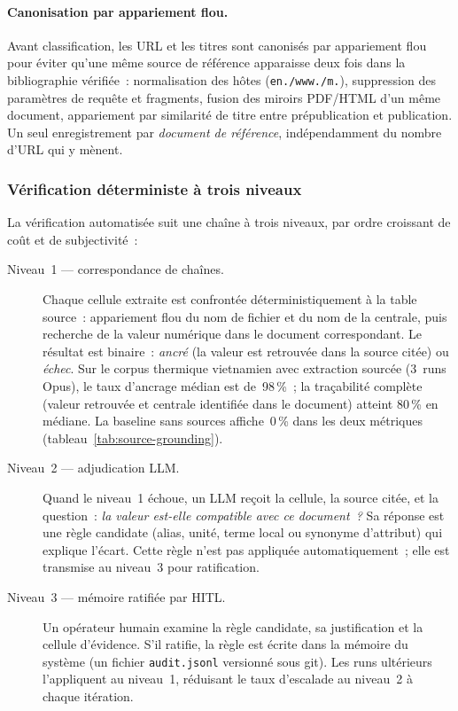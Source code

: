 \paragraph{Canonisation par appariement flou.}
Avant classification, les URL et les titres sont canonisés par
appariement flou pour éviter qu'une même source de référence apparaisse
deux fois dans la bibliographie vérifiée~: normalisation des hôtes
(\texttt{en./www./m.}), suppression des paramètres de requête et
fragments, fusion des miroirs PDF/HTML d'un même document, appariement
par similarité de titre entre prépublication et publication. Un seul
enregistrement par \emph{document de référence}, indépendamment du
nombre d'URL qui y mènent.

\subsubsection{Vérification déterministe à trois niveaux}\label{sec:verif-tiers}

La vérification automatisée suit une chaîne à trois niveaux, par ordre
croissant de coût et de subjectivité~:

\begin{description}
\item[Niveau~1 --- correspondance de chaînes.]
  Chaque cellule extraite est confrontée déterministiquement à la table
  source~: appariement flou du nom de fichier et du nom de la centrale, puis
  recherche de la valeur numérique dans le document correspondant. Le résultat
  est binaire~: \emph{ancré} (la valeur est retrouvée dans la source citée)
  ou \emph{échec}. Sur le corpus thermique vietnamien avec extraction sourcée
  (3~runs Opus), le taux d'ancrage médian est de~98\,\%~; la traçabilité
  complète (valeur retrouvée et centrale identifiée dans le document) atteint
  80\,\% en médiane. La baseline sans sources affiche~0\,\% dans les deux
  métriques (tableau~\ref{tab:source-grounding}).

\item[Niveau~2 --- adjudication LLM.]
  Quand le niveau~1 échoue, un LLM reçoit la cellule, la source citée, et la
  question~: \emph{la valeur est-elle compatible avec ce document~?} Sa
  réponse est une règle candidate (alias, unité, terme local ou synonyme
  d'attribut) qui explique l'écart. Cette règle n'est pas appliquée
  automatiquement~; elle est transmise au niveau~3 pour ratification.

\item[Niveau~3 --- mémoire ratifiée par HITL.]
  Un opérateur humain examine la règle candidate, sa justification et la
  cellule d'évidence. S'il ratifie, la règle est écrite dans la mémoire du
  système (un fichier \texttt{audit.jsonl} versionné sous git). Les runs
  ultérieurs l'appliquent au niveau~1, réduisant le taux d'escalade au
  niveau~2 à chaque itération.
\end{description}

